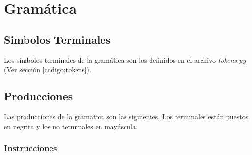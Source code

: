 \section{Gramática}
\label{sec:gramatica}

\subsection{Simbolos Terminales}
	Los símbolos terminales de la gramática son los definidos en el archivo 
	\textit{tokens.py} (Ver sección \ref{codigo:tokens}).

\subsection{Producciones}
	Las producciones de la gramatica son las siguientes. Los terminales
	están puestos en negrita y los no terminales en mayúscula.
\newToken{\SEMICOLON}{;}
\newToken{\LPARENT}{(}
\newToken{\RPARENT}{)}
\newToken{\LBRACKET}{[}
\newToken{\RBRACKET}{]}
\newToken{\LBRACE}{\{}
\newToken{\RBRACE}{\}}
\newToken{\ADD}{+}
\newToken{\MULT}{*}
\newToken{\COMMA}{,}
\newToken{\SUB}{-}
\newToken{\DIV}{/}
\newToken{\COLON}{:}
\newToken{\LAMBDA}{$\lambda$}
\newToken{\LEQ}{$<=$}
\newToken{\LT}{$<$}
\newToken{\GEQ}{$>=$}
\newToken{\GT}{$>$}
\newToken{\LNOTEQ}{!=}
\newToken{\EQUAL}{==}
\newToken{\MOD}{\%}
\newToken{\POW}{\^}
\newToken{\INC}{++}
\newToken{\DEC}{--}


\subsubsection{Instrucciones}
  \begin{reglas}
    \\	
	  \\
    \aregla{\LAMBDA}
    \\
    \aregla{\LAMBDA}
    \\
    \\
    \aregla{\LAMBDA}
  \end{reglas}

